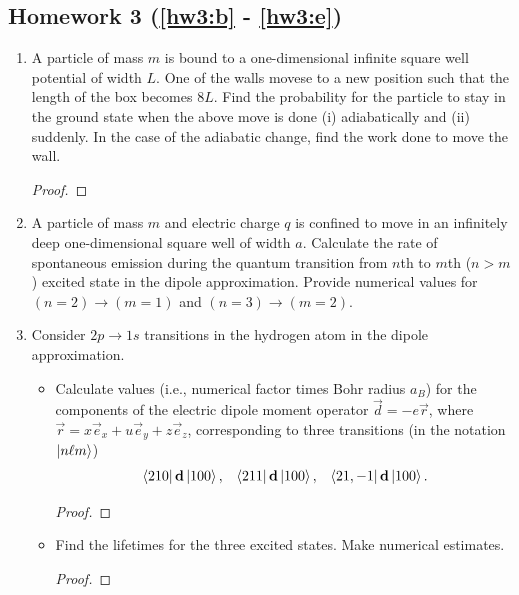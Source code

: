 \documentclass[a4paper]{article}
\begin{document}
\subsection{Homework 3 (\ref{hw3:b} - \ref{hw3:e})}
\begin{enumerate}
\item A particle of mass $m$ is bound to a one-dimensional infinite square
well potential of width $L$. One of the walls movese to a new position such
that the length of the box becomes $8L$. Find the probability for the particle
to stay in the ground state when the above move is done (i) adiabatically and
(ii) suddenly. In the case of the adiabatic change, find the work done to move
the wall.
\begin{ans}
\begin{proof}
\end{proof}
\end{ans}

\item A particle of mass $m$ and electric charge $q$ is confined to move in an
infinitely deep one-dimensional square well of width $a$. Calculate the rate of
spontaneous emission during the quantum transition from $n$th to $m$th ($n>m$)
excited state in the dipole approximation. Provide numerical values for
$(n=2)\to(m=1)$ and $(n=3)\to(m=2)$.

\item Consider $2p\to1s$ transitions in the hydrogen atom in the dipole
approximation.
\begin{itemize}
	\item Calculate values (i.e., numerical factor times Bohr radius $a_B$)
		for the components of the electric dipole moment operator
	$\vec{d} = -e\vec{r}$, where \(\vec{r}=x\vec{e}_x + u\vec{e}_y + 
	z\vec{e}_z\), corresponding to three transitions (in the notation
	$\left\lvert n\ell m\right\rangle$)
	\begin{align*}
		& \left\langle 210 \right\rvert\boldsymbol{\mathbf{d}}\left\lvert 100\right\rangle,
		& \left\langle 211 \right\rvert\boldsymbol{\mathbf{d}}\left\lvert 100\right\rangle, &
		& \left\langle 21,-1 \right\rvert\boldsymbol{\mathbf{d}}\left\lvert 100\right\rangle.
	\end{align*}
	\begin{ans}
	\begin{proof}
	\end{proof}
	\end{ans}

	\item Find the lifetimes for the three excited states. Make numerical
		estimates.
	\begin{ans}
	\begin{proof}
	\end{proof}
	\end{ans}
\end{itemize}
\end{enumerate}
\end{document}
